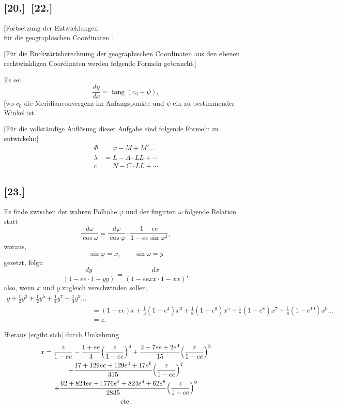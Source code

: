 \documentclass[12pt,a4paper]{article}
\newcommand{\f}[1]{\mathfrak{#1}}
\newcommand{\tang}{\operatorname{tang}}
\begin{document}
\newpage
\subsection*{[20.]--[22.]}
\begin{center}
[Fortsetzung der Entwicklungen\\für die geographischen Coordinaten.]
\end{center}

[Für die Rückwärtsberechnung der geographischen Coordinaten aus den ebenen rechtwinkligen Coordinaten werden folgende Formeln gebraucht.]

Es sei
\[
\frac{dy}{dx} = \tang(c_0 + \psi),
\]
[wo $c_0$ die Meridianconvergenz im Anfangspunkte und $\psi$ ein zu bestimmender Winkel ist.]

[Für die vollständige Auflösung dieser Aufgabe sind folgende Formeln zu entwickeln:]
\begin{align*}
\Phi &= \varphi - M + M'\ldots\\
\lambda &= L - A\cdot LL + \cdots\\
c &= N - C\cdot LL + \cdots
\end{align*}

\subsection*{[23.]}

Es finde zwischen der wahren Polhöhe $\varphi$ und der fingirten $\omega$ folgende Relation statt
\[
\frac{d\omega}{\cos\omega} = \frac{d\varphi}{\cos\varphi}\cdot\frac{1-ee}{1-ee\sin\varphi^2},
\]
woraus,
\[
\sin\varphi = x,\qquad \sin\omega = y
\]
gesetzt, folgt:
\[
\frac{dy}{(1-ee\cdot1-yy)} = \frac{dx}{(1-eexx\cdot1-xx)},
\]
also, wenn $x$ und $y$ zugleich verschwinden sollen,
\begin{align*}
y + \tfrac{1}{2}y^3 + \tfrac{1}{2}y^5 + \tfrac{1}{4}y^7 + \tfrac{1}{4}y^9\ldots\\
&= (1-ee)x + \tfrac{1}{3}(1-e^4)x^3 + \tfrac{1}{8}(1-e^6)x^5 + \tfrac{1}{7}(1-e^8)x^7 + \tfrac{1}{8}(1-e^{10})x^9\ldots\\
&= z.
\end{align*}

Hieraus [ergibt sich] durch Umkehrung
\begin{multline*}
x = \frac{z}{1-ee} - \frac{1+ee}{3}\Bigl(\frac{z}{1-ee}\Bigr)^3 + \frac{2+7ee+2e^4}{15}\Bigl(\frac{z}{1-ee}\Bigr)^5\\
- \frac{17+129ee+129e^4+17e^6}{315}\Bigl(\frac{z}{1-ee}\Bigr)^7\\
+ \frac{62+824ee+1776e^4+824e^6+62e^8}{2835}\Bigl(\frac{z}{1-ee}\Bigr)^9\\
\text{etc.}
\end{multline*}
\end{document}

